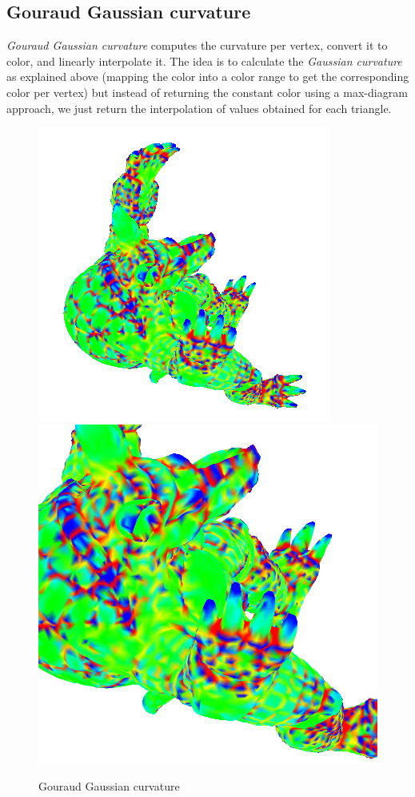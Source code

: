 \subsection{Gouraud Gaussian curvature}
\textit{Gouraud Gaussian curvature} computes the curvature per vertex, convert it to color, and linearly interpolate it. The idea is to calculate the \textit{Gaussian curvature} as explained above (mapping the color into a color range to get the corresponding color per vertex) but instead of returning the constant color using a max-diagram approach, we just return the interpolation of values obtained for each triangle.

\begin{figure}[!h]
    \centering
    \centering
    \includegraphics[scale=1.0]{images/gci-armadillo-top.png}
    \endminipage\hfill
    \centering
    \includegraphics[scale=0.4]{images/gci-detail-armadillo-top.png}
    \endminipage
    \caption{Gouraud Gaussian curvature} \label{fig:gci-detail}
\end{figure}


